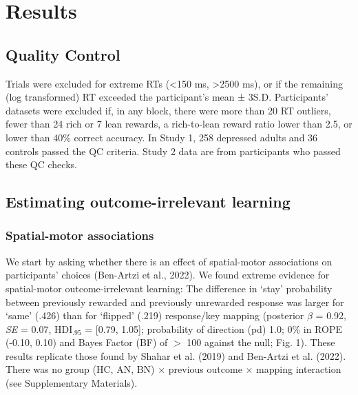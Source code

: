 \documentclass[
  man,floatsintext]{apa6}
\begin{document}
\hypertarget{results}{%
\section{Results}\label{results}}

\hypertarget{quality-control}{%
\subsection{Quality Control}\label{quality-control}}

Trials were excluded for extreme RTs (\textless150 ms, \textgreater2500 ms), or if
the remaining (log transformed) RT exceeded the participant's
mean ± 3S.D. Participants' datasets were excluded if, in any
block, there were more than 20 RT outliers, fewer than 24 rich
or 7 lean rewards, a rich-to-lean reward ratio lower than 2.5, or
lower than 40\% correct accuracy. In Study 1, 258 depressed adults
and 36 controls passed the QC criteria. Study 2 data are from participants who passed these QC checks.

\hypertarget{estimating-outcome-irrelevant-learning}{%
\subsection{Estimating outcome-irrelevant learning}\label{estimating-outcome-irrelevant-learning}}

\hypertarget{spatial-motor-associations}{%
\subsubsection{Spatial-motor associations}\label{spatial-motor-associations}}

We start by asking whether there is an effect of spatial-motor associations on participants' choices (Ben-Artzi et al., 2022). We found extreme evidence for spatial-motor outcome-irrelevant learning: The difference in `stay' probability between previously rewarded and previously unrewarded response was larger for `same' (.426) than for `flipped' (.219) response/key mapping (posterior \(\beta\) = 0.92, \emph{SE} = 0.07, \(\text{HDI}_{.95}\) = {[}0.79, 1.05{]}; probability of direction (pd) 1.0; 0\% in ROPE (-0.10, 0.10) and Bayes Factor (BF) of \(>\) 100 against the null; Fig. 1). These results replicate those found by Shahar et al. (2019) and Ben-Artzi et al. (2022). There was no group (HC, AN, BN) \(\times\) previous outcome \(\times\) mapping interaction (see Supplementary Materials).
\end{document}

